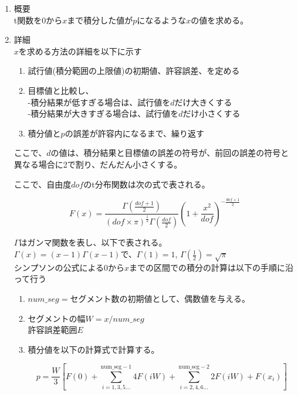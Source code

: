\documentclass[titlepage,a4paper,12pt]{ltjsreport}
\begin{document}

\begin{enumerate}
    \item 概要 \mbox{}\\
    t関数を0から$x$まで積分した値が$p$になるような$x$の値を求める。

    \item 詳細\mbox{}\\
    $x$を求める方法の詳細を以下に示す

    \begin{enumerate}
        \item 試行値(積分範囲の上限値)の初期値、許容誤差、を定める
        \item 目標値と比較し、\\-積分結果が低すぎる場合は、試行値を$d$だけ大きくする\\-積分結果が大きすぎる場合は、試行値を$d$だけ小さくする
        \item 積分値と$p$の誤差が許容内になるまで、繰り返す
    \end{enumerate}

    ここで、$d$の値は、積分結果と目標値の誤差の符号が、前回の誤差の符号と異なる場合に2で割り、だんだん小さくする。

    ここで、自由度$dof$のt分布関数は次の式で表される。
    
    \[
    F(x) = \frac{ \Gamma\left( \frac{dof + 1}{2} \right) }
    { (dof \times \pi)^{\frac{1}{2}} \Gamma\left( \frac{dof}{2} \right) }
    \left( 1 + \frac{x^2}{dof} \right)^{- \frac{dof + 1}{2}}
    \]

    $\Gamma$はガンマ関数を表し、以下で表される。\\
    $\Gamma(x) = (x - 1)\Gamma(x - 1)$で、$\Gamma(1) = 1$, $\Gamma(\frac{1}{2}) = \sqrt{\pi}$\\
    
    シンプソンの公式による0から$x$までの区間での積分の計算は以下の手順に沿って行う

    \begin{enumerate}
        \item $num\_seg = $セグメント数の初期値として、偶数値を与える。
        \item セグメントの幅$W = x/num\_seg$\\ 許容誤差範囲$E$
        \item 積分値を以下の計算式で計算する。
        
        \[
        p = \frac{W}{3} \left[ F(0) + \sum_{i=1,3,5\dots}^{\text{num\_seg}-1} 4F(iW) + \sum_{i=2,4,6\dots}^{\text{num\_seg}-2} 2F(iW) + F(x_i) \right]
        \]


\end{enumerate}
\end{enumerate}
\end{document}
